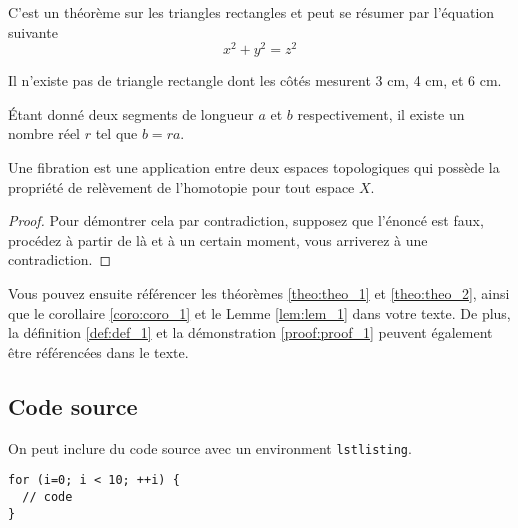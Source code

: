 \begin{theorem}
  \label{theo:theo_2}
  C'est un théorème sur les triangles rectangles et peut se résumer par
  l'équation suivante
  \[ x^2 + y^2 = z^2 \]
\end{theorem}

\begin{corollary}
  \label{coro:coro_1}
  Il n'existe pas de triangle rectangle dont les côtés mesurent 3 cm, 4 cm, et 6 cm.
\end{corollary}

\begin{lemma}
  \label{lem:lem_1}
  Étant donné deux segments de longueur $a$ et $b$ respectivement, il existe un nombre réel $r$ tel que $b=ra$.
\end{lemma}

\begin{definition}[Fibration]
  \label{def:def_1}
  Une fibration est une application entre deux espaces topologiques qui possède la propriété de relèvement de l'homotopie pour tout espace $X$.
\end{definition}

\begin{proof}
  \label{proof:proof_1}
  Pour démontrer cela par contradiction, supposez que l'énoncé est faux,   procédez à partir de là et à un certain moment, vous arriverez à une contradiction.
\end{proof}

Vous pouvez ensuite référencer les théorèmes \ref{theo:theo_1} et \ref{theo:theo_2}, ainsi que le corollaire \ref{coro:coro_1} et le Lemme \ref{lem:lem_1} dans votre texte. De plus, la définition \ref{def:def_1} et la démonstration \ref{proof:proof_1} peuvent également être référencées dans le texte.

\subsection{Code source}

On peut inclure du code source avec un environment \verb+lstlisting+.

\begin{lstlisting}[caption=Exemple de code]
for (i=0; i < 10; ++i) {
  // code
}
\end{lstlisting}


